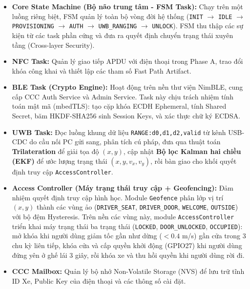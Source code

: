\begin{itemize}
    \item \textbf{Core State Machine (Bộ não trung tâm - FSM Task):} Chạy trên một luồng riêng biệt, FSM quản lý toàn bộ vòng đời hệ thống (\texttt{INIT} $\rightarrow$ \texttt{IDLE} $\rightarrow$ \texttt{PROVISIONING} $\rightarrow$ \texttt{AUTH} $\rightarrow$ \texttt{UWB\_RANGING} $\rightarrow$ \texttt{UNLOCK}). FSM thu thập các sự kiện từ các task phần cứng và đưa ra quyết định chuyển trạng thái xuyên tầng (Cross-layer Security).
    \item \textbf{NFC Task:} Quản lý giao tiếp APDU với điện thoại trong Phase A, trao đổi khóa công khai và thiết lập các tham số Fast Path Artifact.
    \item \textbf{BLE Task (Crypto Engine):} Hoạt động trên nền thư viện NimBLE, cung cấp CCC Auth Service và Admin Service. Task này chịu trách nhiệm tính toán mật mã (mbedTLS): tạo cặp khóa ECDH Ephemeral, tính Shared Secret, băm HKDF-SHA256 sinh Session Keys, và xác thực chữ ký ECDSA.
    \item \textbf{UWB Task:} Đọc luồng khung dữ liệu \texttt{RANGE:d0,d1,d2,valid} từ kênh USB-CDC do cầu nối PC gửi sang, phân tích cú pháp, đưa qua thuật toán \textbf{Trilateration} để giải tọa độ $(x, y)$, cập nhật \textbf{Bộ lọc Kalman hai chiều (EKF)} để ước lượng trạng thái $(x, y, v_x, v_y)$, rồi bàn giao cho khối quyết định truy cập \texttt{AccessController}.
    \item \textbf{Access Controller (Máy trạng thái truy cập + Geofencing):} Đảm nhiệm quyết định truy cập hình học. Module \texttt{Geofence} phân lớp vị trí $(x, y)$ thành các vùng ảo (\texttt{DRIVER\_SEAT}, \texttt{DRIVER\_DOOR}, \texttt{WELCOME}, \texttt{OUTSIDE}) với bộ đệm Hysteresis. Trên nền các vùng này, module \texttt{AccessController} triển khai máy trạng thái ba trạng thái (\texttt{LOCKED}, \texttt{DOOR\_UNLOCKED}, \texttt{OCCUPIED}): mở khóa khi người dùng giảm tốc gần như dừng ($<0.4$ m/s) gần cửa trong 3 chu kỳ liên tiếp, khóa cửa và cấp quyền khởi động (GPIO27) khi người dùng đứng yên ở ghế lái 3 giây, rồi khóa xe và thu hồi quyền khi người dùng rời đi.
    \item \textbf{CCC Mailbox:} Quản lý bộ nhớ Non-Volatile Storage (NVS) để lưu trữ tĩnh ID Xe, Public Key của điện thoại và các thông số cài đặt.
\end{itemize}

